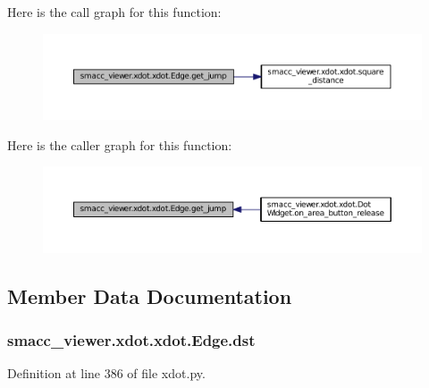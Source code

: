 Here is the call graph for this function\+:
\nopagebreak
\begin{figure}[H]
\begin{center}
\leavevmode
\includegraphics[width=350pt]{classsmacc__viewer_1_1xdot_1_1xdot_1_1Edge_a5c2391bfa8c8a6674b542131e47d1541_cgraph}
\end{center}
\end{figure}




Here is the caller graph for this function\+:
\nopagebreak
\begin{figure}[H]
\begin{center}
\leavevmode
\includegraphics[width=350pt]{classsmacc__viewer_1_1xdot_1_1xdot_1_1Edge_a5c2391bfa8c8a6674b542131e47d1541_icgraph}
\end{center}
\end{figure}




\subsection{Member Data Documentation}
\subsubsection[{\texorpdfstring{dst}{dst}}]{\setlength{\rightskip}{0pt plus 5cm}smacc\+\_\+viewer.\+xdot.\+xdot.\+Edge.\+dst}\hypertarget{classsmacc__viewer_1_1xdot_1_1xdot_1_1Edge_a06202fe28435076ee948cae331614c6f}{}\label{classsmacc__viewer_1_1xdot_1_1xdot_1_1Edge_a06202fe28435076ee948cae331614c6f}


Definition at line 386 of file xdot.\+py.




